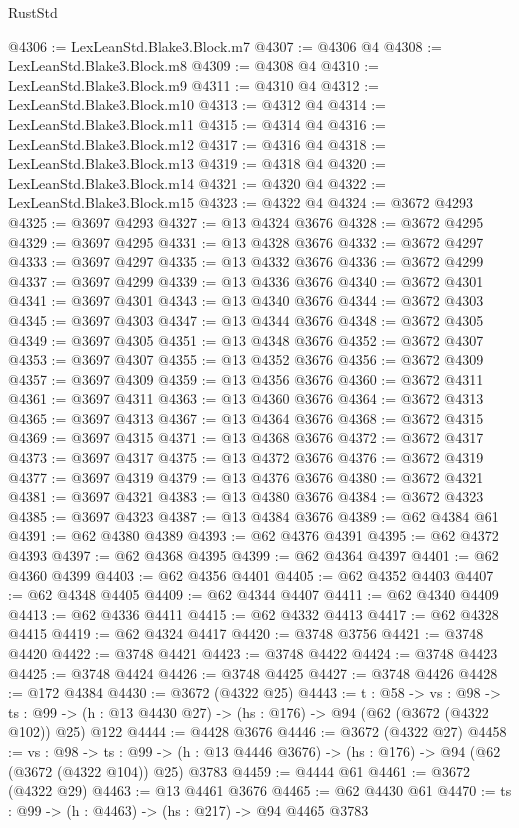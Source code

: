 \begin{lexlean}{RustStd}
\begin{coremodule}
@4306 := LexLeanStd.Blake3.Block.m7
@4307 := @4306 @4
@4308 := LexLeanStd.Blake3.Block.m8
@4309 := @4308 @4
@4310 := LexLeanStd.Blake3.Block.m9
@4311 := @4310 @4
@4312 := LexLeanStd.Blake3.Block.m10
@4313 := @4312 @4
@4314 := LexLeanStd.Blake3.Block.m11
@4315 := @4314 @4
@4316 := LexLeanStd.Blake3.Block.m12
@4317 := @4316 @4
@4318 := LexLeanStd.Blake3.Block.m13
@4319 := @4318 @4
@4320 := LexLeanStd.Blake3.Block.m14
@4321 := @4320 @4
@4322 := LexLeanStd.Blake3.Block.m15
@4323 := @4322 @4
@4324 := @3672 @4293
@4325 := @3697 @4293
@4327 := @13 @4324 @3676
@4328 := @3672 @4295
@4329 := @3697 @4295
@4331 := @13 @4328 @3676
@4332 := @3672 @4297
@4333 := @3697 @4297
@4335 := @13 @4332 @3676
@4336 := @3672 @4299
@4337 := @3697 @4299
@4339 := @13 @4336 @3676
@4340 := @3672 @4301
@4341 := @3697 @4301
@4343 := @13 @4340 @3676
@4344 := @3672 @4303
@4345 := @3697 @4303
@4347 := @13 @4344 @3676
@4348 := @3672 @4305
@4349 := @3697 @4305
@4351 := @13 @4348 @3676
@4352 := @3672 @4307
@4353 := @3697 @4307
@4355 := @13 @4352 @3676
@4356 := @3672 @4309
@4357 := @3697 @4309
@4359 := @13 @4356 @3676
@4360 := @3672 @4311
@4361 := @3697 @4311
@4363 := @13 @4360 @3676
@4364 := @3672 @4313
@4365 := @3697 @4313
@4367 := @13 @4364 @3676
@4368 := @3672 @4315
@4369 := @3697 @4315
@4371 := @13 @4368 @3676
@4372 := @3672 @4317
@4373 := @3697 @4317
@4375 := @13 @4372 @3676
@4376 := @3672 @4319
@4377 := @3697 @4319
@4379 := @13 @4376 @3676
@4380 := @3672 @4321
@4381 := @3697 @4321
@4383 := @13 @4380 @3676
@4384 := @3672 @4323
@4385 := @3697 @4323
@4387 := @13 @4384 @3676
@4389 := @62 @4384 @61
@4391 := @62 @4380 @4389
@4393 := @62 @4376 @4391
@4395 := @62 @4372 @4393
@4397 := @62 @4368 @4395
@4399 := @62 @4364 @4397
@4401 := @62 @4360 @4399
@4403 := @62 @4356 @4401
@4405 := @62 @4352 @4403
@4407 := @62 @4348 @4405
@4409 := @62 @4344 @4407
@4411 := @62 @4340 @4409
@4413 := @62 @4336 @4411
@4415 := @62 @4332 @4413
@4417 := @62 @4328 @4415
@4419 := @62 @4324 @4417
@4420 := @3748 @3756
@4421 := @3748 @4420
@4422 := @3748 @4421
@4423 := @3748 @4422
@4424 := @3748 @4423
@4425 := @3748 @4424
@4426 := @3748 @4425
@4427 := @3748 @4426
@4428 := @172 @4384
@4430 := @3672 (@4322 @25)
@4443 := {t : @58} ->
  {vs : @98} ->
  {ts : @99} -> (h : @13 @4430 @27) -> (hs : @176) -> @94 (@62 (@3672 (@4322 @102)) @25) @122
@4444 := @4428 @3676
@4446 := @3672 (@4322 @27)
@4458 := {vs : @98} ->
  {ts : @99} -> (h : @13 @4446 @3676) -> (hs : @176) -> @94 (@62 (@3672 (@4322 @104)) @25) @3783
@4459 := @4444 @61
@4461 := @3672 (@4322 @29)
@4463 := @13 @4461 @3676
@4465 := @62 @4430 @61
@4470 := {ts : @99} -> (h : @4463) -> (hs : @217) -> @94 @4465 @3783

\end{coremodule}
\end{lexlean}
